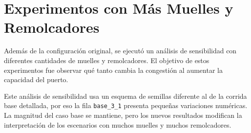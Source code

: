 \documentclass[12pt]{article}
\begin{document}
\section{Experimentos con Más Muelles y Remolcadores}

Además de la configuración original, se ejecutó un análisis de sensibilidad con diferentes cantidades de muelles y remolcadores. El objetivo de estos experimentos fue observar qué tanto cambia la congestión al aumentar la capacidad del puerto.

Este análisis de sensibilidad usa un esquema de semillas diferente al de la corrida base detallada, por eso la fila \texttt{base\_3\_1} presenta pequeñas variaciones numéricas. La magnitud del caso base se mantiene, pero los nuevos resultados modifican la interpretación de los escenarios con muchos muelles y muchos remolcadores.

\begin{table}[H]
\centering
\caption{Configuraciones evaluadas en el análisis de sensibilidad}
\label{tab:configuraciones}
\end{table}
\end{document}
